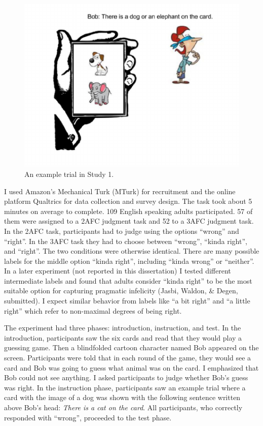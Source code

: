\documentclass[man]{apa6}
\theoremstyle{definition}
\theoremstyle{definition}
\theoremstyle{definition}
\theoremstyle{remark}
\begin{document}
\begin{figure}[t]

{\centering \includegraphics{figs/exampleTrial-1} 

}

\caption{An example trial in Study 1.}\label{fig:exampleTrial}
\end{figure}

I used Amazon's Mechanical Turk (MTurk) for recruitment and the online
platform Qualtrics for data collection and survey design. The task took
about 5 minutes on average to complete. 109 English speaking adults
participated. 57 of them were assigned to a 2AFC judgment task and 52 to
a 3AFC judgment task. In the 2AFC task, participants had to judge using
the options \enquote{wrong} and \enquote{right}. In the 3AFC task they
had to choose between \enquote{wrong}, \enquote{kinda right}, and
\enquote{right}. The two conditions were otherwise identical. There are
many possible labels for the middle option \enquote{kinda right},
including \enquote{kinda wrong} or \enquote{neither}. In a later
experiment (not reported in this dissertation) I tested different
intermediate labels and found that adults consider \enquote{kinda right}
to be the most suitable option for capturing pragmatic infelicity
(Jasbi, Waldon, \& Degen, submitted). I expect similar behavior from
labels like \enquote{a bit right} and \enquote{a little right} which
refer to non-maximal degrees of being right.

The experiment had three phases: introduction, instruction, and test. In
the introduction, participants saw the six cards and read that they
would play a guessing game. Then a blindfolded cartoon character named
Bob appeared on the screen. Participants were told that in each round of
the game, they would see a card and Bob was going to guess what animal
was on the card. I emphasized that Bob could not see anything. I asked
participants to judge whether Bob's guess was right. In the instruction
phase, participants saw an example trial where a card with the image of
a dog was shown with the following sentence written above Bob's head:
\emph{There is a cat on the card}. All participants, who correctly
responded with \enquote{wrong}, proceeded to the test phase.
\end{document}
